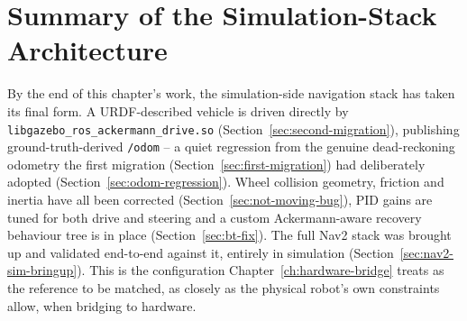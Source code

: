\section{Summary of the Simulation-Stack Architecture}
\label{sec:sim-stack-summary}

By the end of this chapter's work, the simulation-side navigation
stack has taken its final form. A URDF-described vehicle is driven
directly by \texttt{libgazebo\_ros\_ackermann\_drive.so}
(Section~\ref{sec:second-migration}), publishing ground-truth-derived
\texttt{/odom} -- a quiet regression from the genuine dead-reckoning
odometry the first migration (Section~\ref{sec:first-migration}) had
deliberately adopted (Section~\ref{sec:odom-regression}). Wheel
collision geometry, friction and inertia have all been corrected
(Section~\ref{sec:not-moving-bug}), PID gains are tuned for both
drive and steering and a custom Ackermann-aware recovery behaviour
tree is in place (Section~\ref{sec:bt-fix}). The full Nav2 stack
was brought up and validated end-to-end against it, entirely in
simulation (Section~\ref{sec:nav2-sim-bringup}). This is the
configuration
Chapter~\ref{ch:hardware-bridge} treats as the reference to be
matched, as closely as the physical robot's own constraints allow,
when bridging to hardware.
